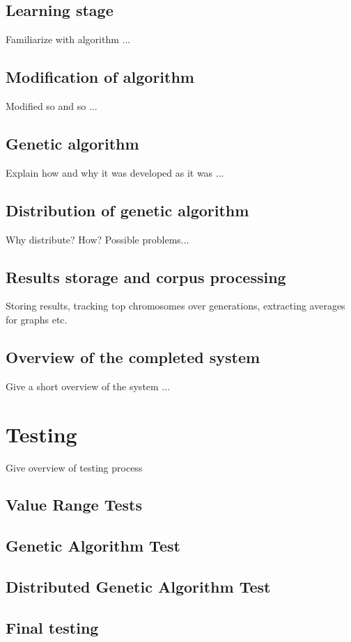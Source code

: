 \subsection{Learning stage}
Familiarize with algorithm ...

\subsection{Modification of algorithm}
Modified so and so ...

\subsection{Genetic algorithm}
Explain how and why it was developed as it was ...

\subsection{Distribution of genetic algorithm}
Why distribute? How? Possible problems...

\subsection{Results storage and corpus processing}
Storing results, tracking top chromosomes over generations, extracting averages for graphs etc.

\subsection{Overview of the completed system}
Give a short overview of the system ...

\section{Testing}
\label{Testing}
Give overview of testing process


\subsection{Value Range Tests}

\subsection{Genetic Algorithm Test}

\subsection{Distributed Genetic Algorithm Test}

\subsection{Final testing}

